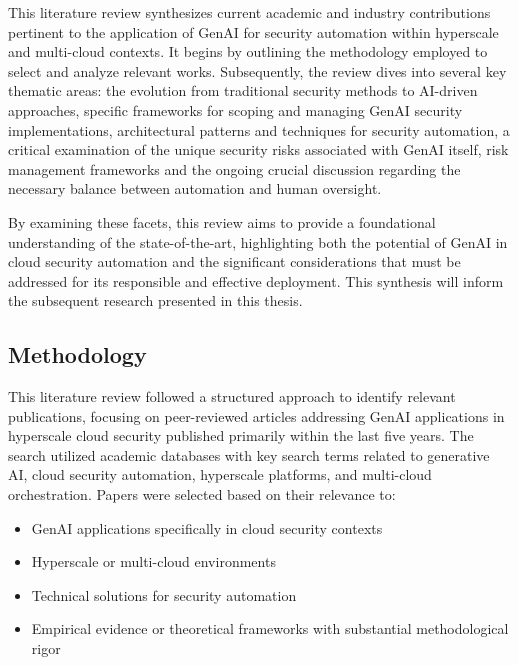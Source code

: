 This literature review synthesizes current academic and industry contributions pertinent to the application of GenAI for security automation within hyperscale and multi-cloud contexts. It begins by outlining the methodology employed to select and analyze relevant works. Subsequently, the review dives into several key thematic areas: the evolution from traditional security methods to AI-driven approaches, specific frameworks for scoping and managing GenAI security implementations, architectural patterns and techniques for security automation, a critical examination of the unique security risks associated with GenAI itself, risk management frameworks and the ongoing crucial discussion regarding the necessary balance between automation and human oversight.

By examining these facets, this review aims to provide a foundational understanding of the state-of-the-art, highlighting both the potential of GenAI in cloud security automation and the significant considerations that must be addressed for its responsible and effective deployment. This synthesis will inform the subsequent research presented in this thesis.

\subsection{Methodology} %
\label{sec:Methodology}

This literature review followed a structured approach to identify relevant publications, focusing on peer-reviewed articles addressing GenAI applications in hyperscale cloud security published primarily within the last five years. The search utilized academic databases with key search terms related to generative AI, cloud security automation, hyperscale platforms, and multi-cloud orchestration.
Papers were selected based on their relevance to:

\begin{itemize}
\item GenAI applications specifically in cloud security contexts
\item Hyperscale or multi-cloud environments
\item Technical solutions for security automation
\item Empirical evidence or theoretical frameworks with substantial methodological rigor
\end{itemize}

